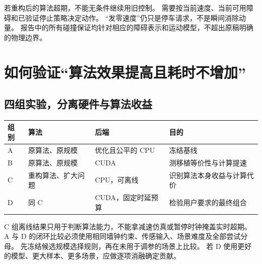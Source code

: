 若重构后的算法超期，不能无条件继续用旧控制。
需要按当前速度、当前可用障碍和已验证停止策略决定动作。
“发零速度”仍只是停车请求，不是瞬间消除动量。
报告中的所有碰撞保证均针对相应的障碍表示和运动模型，不超出原稿明确的物理边界。

\section{如何验证“算法效果提高且耗时不增加”}
\subsection{四组实验，分离硬件与算法收益}
\begin{center}\small
\begin{tabular}{p{}p{}p{}p{}}
\toprule 组别 & 算法 & 后端 & 目的\\\midrule
A & 原算法、原规模 & 优化且公平的 CPU & 冻结基线\\
B & 原算法、原规模 & CUDA & 测移植等价性与计算提速\\
C & 重构算法、扩大问题 & CPU，可离线 & 识别算法本身收益与计算代价\\
D & 同 C & CUDA，固定时延预算 & 检验用户要求的最终组合\\
\bottomrule
\end{tabular}
\end{center}
C 组离线结果只用于判断算法能力，不能拿减速仿真或暂停时钟掩盖实时超期。
A 与 D 的闭环比较必须使用相同墙钟约束、传感输入、场景难度及全部尝试分母。
先冻结候选规模选择规则，再在未用于调参的场景上比较。
若 D 使用更好的模型、更大样本、更多场景，应做逐项消融确定贡献。

